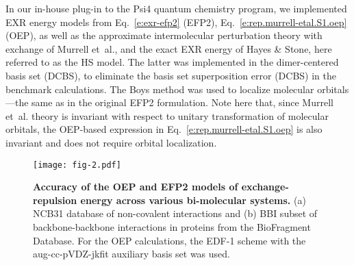 \documentclass[aip,jcp,amsmath,amssymb,preprint,floatfix]{revtex4-1}
\begin{document}
In our in\hyp{}house plug-in to the {\sc Psi4}
quantum chemistry
program,\cite{Psi4.JCTC.2017}
we implemented EXR energy models from Eq.~\eqref{e:exr-efp2}
(EFP2), Eq.~\eqref{e:rep.murrell-etal.S1.oep} (OEP), as well as 
the approximate intermolecular perturbation theory with exchange of 
Murrell et~al.\cite{Murrell.Randic.Williams.Longuet-Higgins.ProcRSocLondA.1965},
and the exact EXR energy of Hayes \& Stone\cite{Hayes.Stone.MolPhys.1984},
here referred to as the HS model.
The latter was
implemented in the dimer\hyp{}centered basis set\cite{Chalasinski.Gutowski.MolPhys.1985} (DCBS),
to eliminate the basis set
superposition error (DCBS) in the benchmark calculations.
The Boys method\cite{Boys.RevModPhys.1960} was used to localize
molecular orbitals---the same as in the original EFP2 formulation.
Note here that, since
Murrell et~al. theory is invariant with respect to unitary transformation
of molecular orbitals, the OEP\hyp{}based expression 
in Eq.~\eqref{e:rep.murrell-etal.S1.oep} is also invariant and does not require
orbital localization. 
%
%
%
\begin{figure*}[t]
\texttt{[image: fig-2.pdf]}
\caption{\label{f:fig-2} {\bf Accuracy of the OEP and EFP2 models of exchange\hyp{}repulsion energy
across various bi\hyp{}molecular systems.} 
(a) NCB31 
database\cite{Zhao.Schultz.Truhlar.JCTC.2006,
Zhao.Truhlar.JCTC.2005,Zhao.Schultz.Truhlar.JCTC.2006,Zhao.Schultz.Truhlar.JCP.2005} 
of non\hyp{}covalent interactions
and
(b) BBI subset\cite{Burns.Faver.Zheng.Marshall.Smith.Vanommeslaeghe.MacKerell.Merz.Sherrill.JCP.2017} 
of backbone\hyp{}backbone interactions in proteins from the BioFragment Database.
For the OEP calculations, the EDF-1 scheme with the aug-cc-pVDZ-jkfit auxiliary basis set
was used.
} 
\end{figure*}
%
\end{document}
